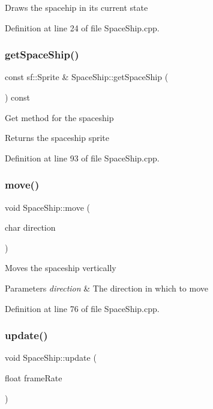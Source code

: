 Draws the spacehip in its current state 

Definition at line 24 of file Space\+Ship.\+cpp.

\mbox{\label{class_space_ship_a7529626398ca826b83b19bd06ec0ba2e}} 
\subsubsection{\texorpdfstring{getSpaceShip()}{getSpaceShip()}}
{\footnotesize\ttfamily const sf\+::\+Sprite \& Space\+Ship\+::get\+Space\+Ship (\begin{DoxyParamCaption}{ }\end{DoxyParamCaption}) const}

Get method for the spaceship \begin{DoxyReturn}{Returns}
the spaceship sprite 
\end{DoxyReturn}


Definition at line 93 of file Space\+Ship.\+cpp.

\mbox{\label{class_space_ship_a38ae22af5e0f792b9e26ec257b4bd47a}} 
\subsubsection{\texorpdfstring{move()}{move()}}
{\footnotesize\ttfamily void Space\+Ship\+::move (\begin{DoxyParamCaption}\item[{char}]{direction }\end{DoxyParamCaption})}

Moves the spaceship vertically 
\begin{DoxyParams}{Parameters}
{\em direction} & The direction in which to move \\
\hline
\end{DoxyParams}


Definition at line 76 of file Space\+Ship.\+cpp.

\mbox{\label{class_space_ship_a9de49446d7a2029f7d05537d2f5d6768}} 
\subsubsection{\texorpdfstring{update()}{update()}}
{\footnotesize\ttfamily void Space\+Ship\+::update (\begin{DoxyParamCaption}\item[{float}]{frame\+Rate }\end{DoxyParamCaption})}

